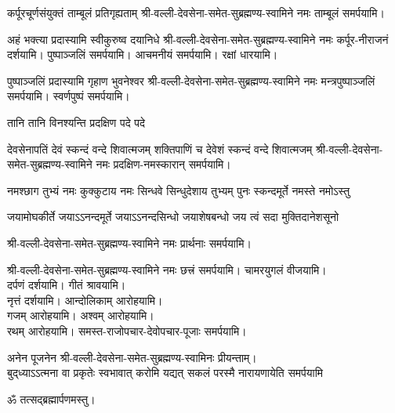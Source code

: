 {कर्पूरचूर्णसंयुक्तं ताम्बूलं प्रतिगृह्यताम्}
श्री-वल्ली-देवसेना-समेत-सुब्रह्मण्य-स्वामिने नमः ताम्बूलं समर्पयामि।

{अहं भक्त्या प्रदास्यामि स्वीकुरुष्व दयानिधे}
श्री-वल्ली-देवसेना-समेत-सुब्रह्मण्य-स्वामिने नमः कर्पूर-नीराजनं दर्शयामि। 
पुष्पाञ्जलिं समर्पयामि। आचमनीयं समर्पयामि। रक्षां धारयामि।

{पुष्पाञ्जलिं प्रदास्यामि गृहाण भुवनेश्वर}
श्री-वल्ली-देवसेना-समेत-सुब्रह्मण्य-स्वामिने नमः मन्त्रपुष्पाञ्जलिं समर्पयामि। स्वर्णपुष्पं समर्पयामि।

{तानि तानि विनश्यन्ति प्रदक्षिण पदे पदे}

{देवसेनापतिं देवं स्कन्दं वन्दे शिवात्मजम्}
{शक्तिपाणिं च देवेशं स्कन्दं वन्दे शिवात्मजम्}
श्री-वल्ली-देवसेना-समेत-सुब्रह्मण्य-स्वामिने नमः प्रदक्षिण-नमस्कारान् समर्पयामि।

{नमश्छाग तुभ्यं नमः कुक्कुटाय}
{नमः सिन्धवे सिन्धुदेशाय तुभ्यम्}
{पुनः स्कन्दमूर्ते नमस्ते नमोऽस्तु}

{जयामोघकीर्ते जयाऽऽनन्दमूर्ते}
{जयाऽऽनन्दसिन्धो जयाशेषबन्धो}
{जय त्वं सदा मुक्तिदानेशसूनो}

श्री-वल्ली-देवसेना-समेत-सुब्रह्मण्य-स्वामिने नमः प्रार्थनाः समर्पयामि।

श्री-वल्ली-देवसेना-समेत-सुब्रह्मण्य-स्वामिने नमः छत्त्रं समर्पयामि।
चामरयुगलं वीजयामि।\\
दर्पणं दर्शयामि। गीतं श्रावयामि। \\
नृत्तं दर्शयामि। आन्दोलिकाम् आरोहयामि।\\
गजम् आरोहयामि। अश्वम् आरोहयामि।\\
रथम् आरोहयामि। समस्त-राजोपचार-देवोपचार-पूजाः समर्पयामि।


अनेन पूजनेन श्री-वल्ली-देवसेना-समेत-सुब्रह्मण्य-स्वामिनः प्रीयन्ताम्। \\


{बुद्‌ध्याऽऽत्मना वा प्रकृतेः स्वभावात्}
{करोमि यद्यत् सकलं परस्मै}
{नारायणायेति समर्पयामि}

ॐ तत्सद्ब्रह्मार्पणमस्तु।